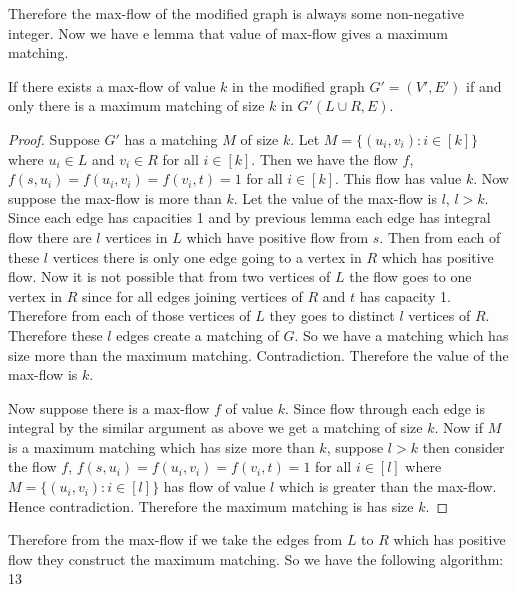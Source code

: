 \documentclass[twoside]{article}
\begin{document}
Therefore the max-flow of the modified graph is always some non-negative integer. Now we have e lemma that value of max-flow gives a maximum matching.
\begin{lemma}{}{}
	If there exists a max-flow of value $k$ in the modified graph $G'=(V',E')$ if and only there is a maximum matching of size $k$ in $G'(L\cup R, E)$. 
\end{lemma}
\begin{proof}
	Suppose $G'$ has a matching $M$ of size $k$. Let $M=\{(u_i,v_i)\colon i\in[k]\}$ where $u_i\in L$ and $v_i\in R$ for all $i\in[k]$. Then we have the flow $f$, $f(s,u_i)=f(u_i,v_i)=f(v_i,t)=1$ for all $i\in[k]$. This flow has value $k$. Now suppose the max-flow is more than $k$. Let the value of the max-flow is $l$, $l>k$. Since each edge has capacities 1 and by previous lemma each edge has integral flow there are $l$ vertices in $L$ which have positive flow from $s$. Then from each of these $l$ vertices there is only one edge going to a vertex in $R$ which has positive flow. Now it is not possible that from two vertices of $L$ the flow goes to one vertex in $R$ since for all edges joining vertices of $R$ and $t$ has capacity 1. Therefore from each of those vertices of $L$ they goes to distinct $l$ vertices of $R$. Therefore these $l$ edges  create a matching of $G$. So we have a matching which has size more than the maximum matching. Contradiction. Therefore the value of the max-flow is $k$.
	
	Now suppose there is a max-flow $f$ of value $k$. Since flow through each edge is integral by the similar argument as above we get a matching of size $k$. Now if $M$ is a maximum matching which has size more than $k$, suppose $l>k$ then consider the flow  $f$, $f(s,u_i)=f(u_i,v_i)=f(v_i,t)=1$ for all $i\in[l]$ where  $M=\{(u_i,v_i)\colon i\in[l]\}$ has flow of value $l$ which is greater than the max-flow. Hence contradiction. Therefore the maximum matching is has size $k$.
\end{proof}


Therefore from the max-flow if we take the edges from $L$ to $R$ which has positive flow they construct the maximum matching. So we have the following algorithm: 13
\begin{algorithm}\DontPrintSemicolon
	\caption{}
\end{algorithm} 
\end{document}
